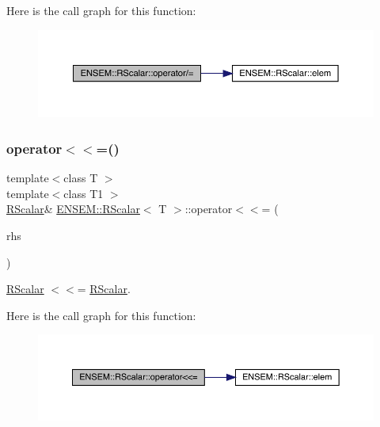 Here is the call graph for this function\+:
\nopagebreak
\begin{figure}[H]
\begin{center}
\leavevmode
\includegraphics[width=350pt]{d0/d8c/classENSEM_1_1RScalar_a8d8cc49d7fed142b93c987c653465000_cgraph}
\end{center}
\end{figure}
\mbox{\label{classENSEM_1_1RScalar_a4f12bedac2ac4848354e3c3018f6c9aa}} 
\subsubsection{\texorpdfstring{operator$<$$<$=()}{operator<<=()}\hspace{0.1cm}{\footnotesize\ttfamily [1/2]}}
{\footnotesize\ttfamily template$<$class T $>$ \\
template$<$class T1 $>$ \\
\mbox{\hyperlink{classENSEM_1_1RScalar}{R\+Scalar}}\& \mbox{\hyperlink{classENSEM_1_1RScalar}{E\+N\+S\+E\+M\+::\+R\+Scalar}}$<$ T $>$\+::operator$<$$<$= (\begin{DoxyParamCaption}\item[{const \mbox{\hyperlink{classENSEM_1_1RScalar}{R\+Scalar}}$<$ T1 $>$ \&}]{rhs }\end{DoxyParamCaption})\hspace{0.3cm}{\ttfamily [inline]}}



\mbox{\hyperlink{classENSEM_1_1RScalar}{R\+Scalar}} $<$$<$= \mbox{\hyperlink{classENSEM_1_1RScalar}{R\+Scalar}}. 

Here is the call graph for this function\+:
\nopagebreak
\begin{figure}[H]
\begin{center}
\leavevmode
\includegraphics[width=350pt]{d0/d8c/classENSEM_1_1RScalar_a4f12bedac2ac4848354e3c3018f6c9aa_cgraph}
\end{center}
\end{figure}
\mbox{\label{classENSEM_1_1RScalar_a4f12bedac2ac4848354e3c3018f6c9aa}} 
